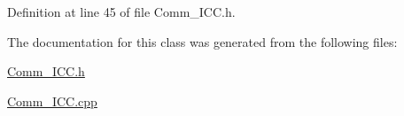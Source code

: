 Definition at line 45 of file Comm\+\_\+\+I\+C\+C.\+h.



The documentation for this class was generated from the following files\+:\begin{DoxyCompactItemize}
\item 
\mbox{\hyperlink{_comm___i_c_c_8h}{Comm\+\_\+\+I\+C\+C.\+h}}\item 
\mbox{\hyperlink{_comm___i_c_c_8cpp}{Comm\+\_\+\+I\+C\+C.\+cpp}}\end{DoxyCompactItemize}
